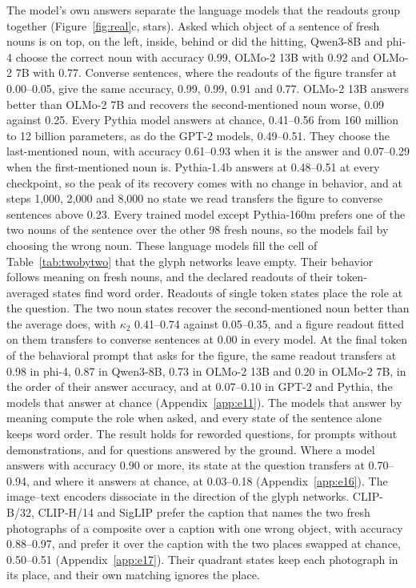 \documentclass[10pt]{article}
\theoremstyle{plain}
\theoremstyle{remark}
\begin{document}
The model's own answers separate the language models that the readouts group together (Figure~\ref{fig:real}c, stars). Asked which object of a sentence of fresh nouns is on top, on the left, inside, behind or did the hitting, Qwen3-8B and phi-4 choose the correct noun with accuracy 0.99, OLMo-2 13B with 0.92 and OLMo-2 7B with 0.77. Converse sentences, where the readouts of the figure transfer at 0.00--0.05, give the same accuracy, 0.99, 0.99, 0.91 and 0.77. OLMo-2 13B answers better than OLMo-2 7B and recovers the second-mentioned noun worse, 0.09 against 0.25. Every Pythia model answers at chance, 0.41--0.56 from 160 million to 12 billion parameters, as do the GPT-2 models, 0.49--0.51. They choose the last-mentioned noun, with accuracy 0.61--0.93 when it is the answer and 0.07--0.29 when the first-mentioned noun is. Pythia-1.4b answers at 0.48--0.51 at every checkpoint, so the peak of its recovery comes with no change in behavior, and at steps 1{,}000, 2{,}000 and 8{,}000 no state we read transfers the figure to converse sentences above 0.23. Every trained model except Pythia-160m prefers one of the two nouns of the sentence over the other 98 fresh nouns, so the models fail by choosing the wrong noun. These language models fill the cell of Table~\ref{tab:twobytwo} that the glyph networks leave empty. Their behavior follows meaning on fresh nouns, and the declared readouts of their token-averaged states find word order. Readouts of single token states place the role at the question. The two noun states recover the second-mentioned noun better than the average does, with $\kappa_2$ 0.41--0.74 against 0.05--0.35, and a figure readout fitted on them transfers to converse sentences at 0.00 in every model. At the final token of the behavioral prompt that asks for the figure, the same readout transfers at 0.98 in phi-4, 0.87 in Qwen3-8B, 0.73 in OLMo-2 13B and 0.20 in OLMo-2 7B, in the order of their answer accuracy, and at 0.07--0.10 in GPT-2 and Pythia, the models that answer at chance (Appendix~\ref{app:e11}). The models that answer by meaning compute the role when asked, and every state of the sentence alone keeps word order. The result holds for reworded questions, for prompts without demonstrations, and for questions answered by the ground. Where a model answers with accuracy 0.90 or more, its state at the question transfers at 0.70--0.94, and where it answers at chance, at 0.03--0.18 (Appendix~\ref{app:e16}). The image--text encoders dissociate in the direction of the glyph networks. CLIP-B/32, CLIP-H/14 and SigLIP prefer the caption that names the two fresh photographs of a composite over a caption with one wrong object, with accuracy 0.88--0.97, and prefer it over the caption with the two places swapped at chance, 0.50--0.51 (Appendix~\ref{app:e17}). Their quadrant states keep each photograph in its place, and their own matching ignores the place.
\end{document}
